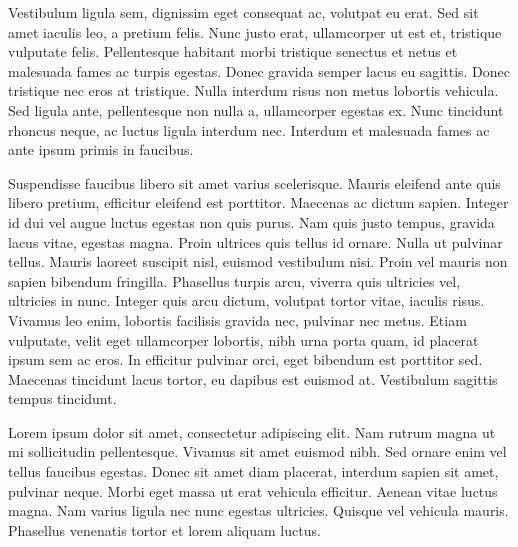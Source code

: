 Vestibulum ligula sem, dignissim eget consequat ac, volutpat eu erat. Sed sit amet iaculis leo, a pretium felis. Nunc justo erat, ullamcorper ut est et, tristique vulputate felis. Pellentesque habitant morbi tristique senectus et netus et malesuada fames ac turpis egestas. Donec gravida semper lacus eu sagittis. Donec tristique nec eros at tristique. Nulla interdum risus non metus lobortis vehicula. Sed ligula ante, pellentesque non nulla a, ullamcorper egestas ex. Nunc tincidunt rhoncus neque, ac luctus ligula interdum nec. Interdum et malesuada fames ac ante ipsum primis in faucibus.

Suspendisse faucibus libero sit amet varius scelerisque. Mauris eleifend ante quis libero pretium, efficitur eleifend est porttitor. Maecenas ac dictum sapien. Integer id dui vel augue luctus egestas non quis purus. Nam quis justo tempus, gravida lacus vitae, egestas magna. Proin ultrices quis tellus id ornare. Nulla ut pulvinar tellus. Mauris laoreet suscipit nisl, euismod vestibulum nisi. Proin vel mauris non sapien bibendum fringilla. Phasellus turpis arcu, viverra quis ultricies vel, ultricies in nunc. Integer quis arcu dictum, volutpat tortor vitae, iaculis risus. Vivamus leo enim, lobortis facilisis gravida nec, pulvinar nec metus. Etiam vulputate, velit eget ullamcorper lobortis, nibh urna porta quam, id placerat ipsum sem ac eros. In efficitur pulvinar orci, eget bibendum est porttitor sed. Maecenas tincidunt lacus tortor, eu dapibus est euismod at. Vestibulum sagittis tempus tincidunt. 


Lorem ipsum dolor sit amet, consectetur adipiscing elit. Nam rutrum magna ut mi sollicitudin pellentesque. Vivamus sit amet euismod nibh. Sed ornare enim vel tellus faucibus egestas. Donec sit amet diam placerat, interdum sapien sit amet, pulvinar neque. Morbi eget massa ut erat vehicula efficitur. Aenean vitae luctus magna. Nam varius ligula nec nunc egestas ultricies. Quisque vel vehicula mauris. Phasellus venenatis tortor et lorem aliquam luctus.